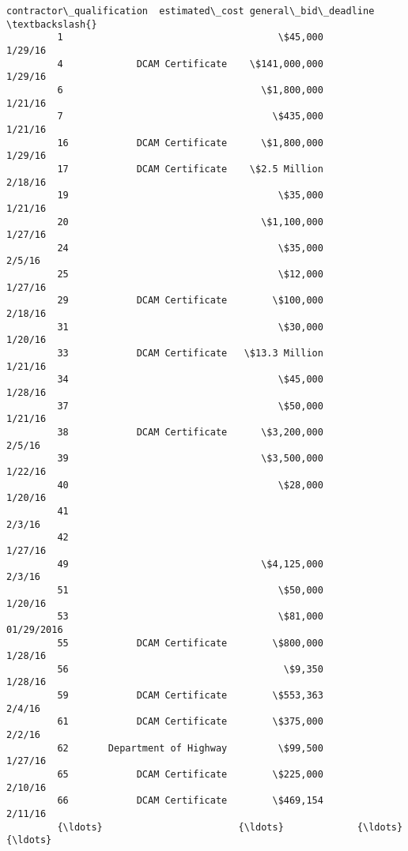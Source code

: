 \documentclass[11pt]{article}
\begin{document}
\begin{Verbatim}[commandchars=\\\{\}]
               contractor\_qualification  estimated\_cost general\_bid\_deadline  \textbackslash{}
         1                                      \$45,000              1/29/16   
         4             DCAM Certificate    \$141,000,000              1/29/16   
         6                                   \$1,800,000              1/21/16   
         7                                     \$435,000              1/21/16   
         16            DCAM Certificate      \$1,800,000              1/29/16   
         17            DCAM Certificate    \$2.5 Million              2/18/16   
         19                                     \$35,000              1/21/16   
         20                                  \$1,100,000              1/27/16   
         24                                     \$35,000               2/5/16   
         25                                     \$12,000              1/27/16   
         29            DCAM Certificate        \$100,000              2/18/16   
         31                                     \$30,000              1/20/16   
         33            DCAM Certificate   \$13.3 Million              1/21/16   
         34                                     \$45,000              1/28/16   
         37                                     \$50,000              1/21/16   
         38            DCAM Certificate      \$3,200,000               2/5/16   
         39                                  \$3,500,000              1/22/16   
         40                                     \$28,000              1/20/16   
         41                                                           2/3/16   
         42                                                          1/27/16   
         49                                  \$4,125,000               2/3/16   
         51                                     \$50,000              1/20/16   
         53                                     \$81,000           01/29/2016   
         55            DCAM Certificate        \$800,000              1/28/16   
         56                                      \$9,350              1/28/16   
         59            DCAM Certificate        \$553,363               2/4/16   
         61            DCAM Certificate        \$375,000               2/2/16   
         62       Department of Highway         \$99,500              1/27/16   
         65            DCAM Certificate        \$225,000              2/10/16   
         66            DCAM Certificate        \$469,154              2/11/16   
         {\ldots}                        {\ldots}             {\ldots}                  {\ldots}   

\end{Verbatim}
\end{document}
